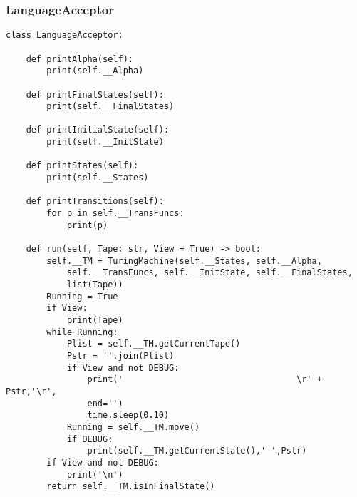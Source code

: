 \documentclass[12pt]{article}
\begin{document}
\subsubsection{LanguageAcceptor}
\begin{lstlisting}
class LanguageAcceptor:

    def printAlpha(self):
        print(self.__Alpha)

    def printFinalStates(self):
        print(self.__FinalStates)

    def printInitialState(self):
        print(self.__InitState)

    def printStates(self):
        print(self.__States)
    
    def printTransitions(self):
        for p in self.__TransFuncs:
            print(p)

    def run(self, Tape: str, View = True) -> bool:
        self.__TM = TuringMachine(self.__States, self.__Alpha, 
            self.__TransFuncs, self.__InitState, self.__FinalStates, 
            list(Tape))
        Running = True
        if View:
            print(Tape)
        while Running:
            Plist = self.__TM.getCurrentTape()
            Pstr = ''.join(Plist)
            if View and not DEBUG:
                print('                                  \r' + Pstr,'\r', 
                end='')
                time.sleep(0.10)
            Running = self.__TM.move()
            if DEBUG:
                print(self.__TM.getCurrentState(),' ',Pstr)
        if View and not DEBUG:
            print('\n')
        return self.__TM.isInFinalState()
\end{lstlisting}
\end{document}
